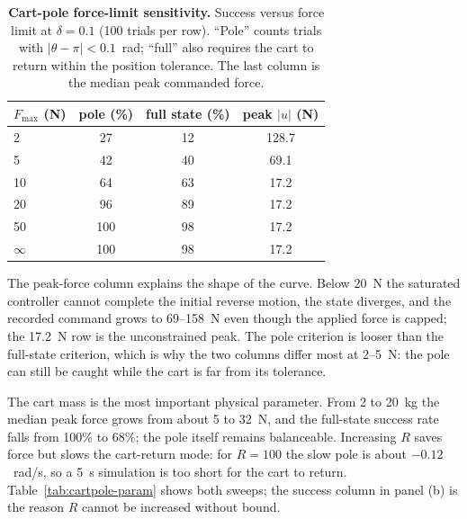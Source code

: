 \documentclass[11pt]{report}
\begin{document}
\begin{table}[!htbp]
\centering
\small
\caption{\textbf{Cart-pole force-limit sensitivity.}  Success versus force limit at $\delta=0.1$ (100 trials per
row).  ``Pole'' counts trials with $|\theta-\pi|<0.1$~rad; ``full'' also
requires the cart to return within the position tolerance.  The last column is
the median peak commanded force.}
\label{tab:cartpole-force}
\begin{tabular}{@{}lccc@{}}
\toprule
\(F_{\max}\) (N) & pole (\%) & full state (\%) & peak \(|u|\) (N) \\
\midrule
2  & 27 & 12 & 128.7 \\
5  & 42 & 40 & 69.1 \\
10 & 64 & 63 & 17.2 \\
20 & 96 & 89 & 17.2 \\
50 & 100 & 98 & 17.2 \\
$\infty$ & 100 & 98 & 17.2 \\
\bottomrule
\end{tabular}
\end{table}

The peak-force column explains the shape of the curve.  Below 20~N the
saturated controller cannot complete the initial reverse motion, the state
diverges, and the recorded command grows to 69–158~N even though the applied
force is capped; the 17.2~N row is the unconstrained peak.  The pole criterion
is looser than the full-state criterion, which is why the two columns differ
most at 2–5~N: the pole can still be caught while the cart is far from its
tolerance.

The cart mass is the most important physical parameter.  From 2 to 20~kg the
median peak force grows from about 5 to 32~N, and the full-state success rate
falls from 100\% to 68\%; the pole itself remains balanceable.  Increasing
$R$ saves force but slows the cart-return mode: for $R=100$ the slow pole is
about $-0.12$~rad/s, so a 5~s simulation is too short for the cart to return.
Table~\ref{tab:cartpole-param} shows both sweeps; the success column in panel
(b) is the reason $R$ cannot be increased without bound.
\end{document}
